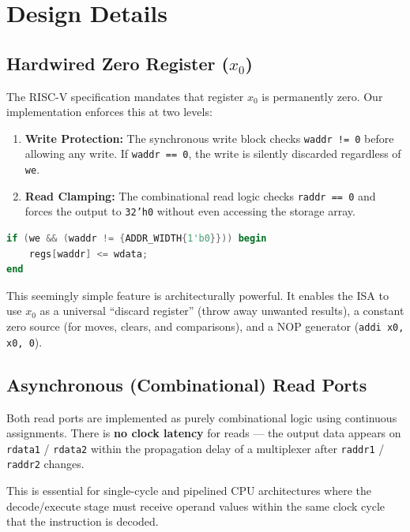 \documentclass[12pt,a4paper]{article}
\begin{document}
\section{Design Details}

\subsection{Hardwired Zero Register ($x_0$)}

The RISC-V specification mandates that register $x_0$ is permanently zero. Our implementation enforces this at two levels:

\begin{enumerate}
    \item \textbf{Write Protection:} The synchronous write block checks \texttt{waddr != 0} before allowing any write. If \texttt{waddr == 0}, the write is silently discarded regardless of \texttt{we}.
    \item \textbf{Read Clamping:} The combinational read logic checks \texttt{raddr == 0} and forces the output to \texttt{32'h0} without even accessing the storage array.
\end{enumerate}

\begin{lstlisting}[language=Verilog, caption={Write protection for $x_0$}]
if (we && (waddr != {ADDR_WIDTH{1'b0}})) begin
    regs[waddr] <= wdata;
end
\end{lstlisting}

This seemingly simple feature is architecturally powerful. It enables the ISA to use $x_0$ as a universal ``discard register'' (throw away unwanted results), a constant zero source (for moves, clears, and comparisons), and a NOP generator (\texttt{addi x0, x0, 0}).

\subsection{Asynchronous (Combinational) Read Ports}

Both read ports are implemented as purely combinational logic using continuous assignments. There is \textbf{no clock latency} for reads — the output data appears on \texttt{rdata1} / \texttt{rdata2} within the propagation delay of a multiplexer after \texttt{raddr1} / \texttt{raddr2} changes.

This is essential for single-cycle and pipelined CPU architectures where the decode/execute stage must receive operand values within the same clock cycle that the instruction is decoded.
\end{document}
